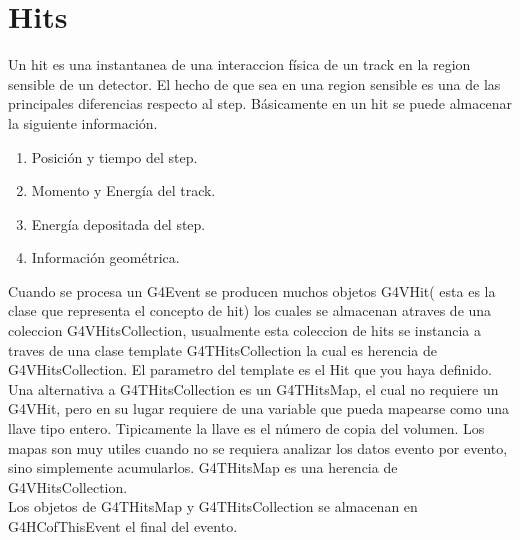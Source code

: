 \documentclass[10pt,a4paper,oneside]{book}
\begin{document}
\section*{Hits}
Un hit es una instantanea de una interaccion física de un track en la
region sensible de un detector. El hecho de que sea en una region
sensible es una de las principales diferencias respecto al
step. Básicamente en un hit se puede almacenar la siguiente
información.
\begin{enumerate}
\item Posición y tiempo del step.
\item Momento y Energía del track.
\item Energía depositada del step.
\item Información geométrica.
\end{enumerate}
Cuando se procesa un G4Event se producen muchos objetos G4VHit( esta
es la clase que representa el concepto de hit) los cuales se almacenan
atraves de una coleccion G4VHitsCollection, usualmente esta coleccion
de hits se instancia a traves de una clase template G4THitsCollection
la cual es herencia de G4VHitsCollection. El parametro del template es
el Hit que you haya definido.
\\
Una alternativa a G4THitsCollection es un G4THitsMap, el cual no
requiere un G4VHit, pero en su lugar requiere de una variable que
pueda mapearse como una llave tipo entero. Tipicamente la llave es el
número de copia del volumen. Los mapas son muy utiles cuando no se
requiera analizar los datos evento por evento, sino simplemente
acumularlos. G4THitsMap es una herencia de G4VHitsCollection.
\\
Los objetos de G4THitsMap y G4THitsCollection se almacenan en
G4HCofThisEvent el final del evento.
\end{document}
